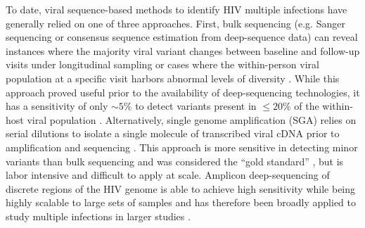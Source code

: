 \documentclass[10pt,letterpaper]{article}
\begin{document}
To date, viral sequence-based methods to identify HIV multiple infections have generally relied on one of three approaches. First, bulk sequencing (e.g. Sanger  sequencing or consensus sequence estimation from deep-sequence data) can reveal instances where the majority viral variant changes between baseline and follow-up visits under longitudinal sampling or cases where the within-person viral population at a specific visit harbors abnormal levels of diversity \cite{smith2004, cornelissen2007, vanderkuyl2009, chaudron2022}. While this approach proved useful prior to the availability of deep-sequencing technologies, it has a sensitivity of only $\sim5\%$ to detect variants present in $\leq20\%$ of the within-host viral population \cite{rachinger2010}. Alternatively, single genome amplification (SGA) relies on serial dilutions to isolate a single molecule of transcribed viral cDNA prior to amplification and sequencing \cite{sheward2015, ssemwanga2018, woodson2019}. This approach is more sensitive in detecting minor variants than bulk sequencing and was considered the ``gold standard'' \cite{pacold2010}, but is labor intensive and difficult to apply at scale. Amplicon deep-sequencing of discrete regions of the HIV genome is able to achieve high sensitivity while being highly scalable to large sets of samples and has therefore been broadly applied to study multiple infections in larger studies \cite{pacold2010, redd2011, redd2012, redd2014, ronen2013}. \par
\end{document}
